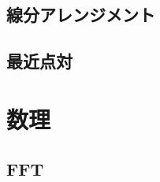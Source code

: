 \documentclass[landscape,twocolumn,9pt]{jsarticle}
\begin{document}
\subsection{線分アレンジメント}


\subsection{最近点対}


\section{数理}

\subsection{FFT}

\end{document}
